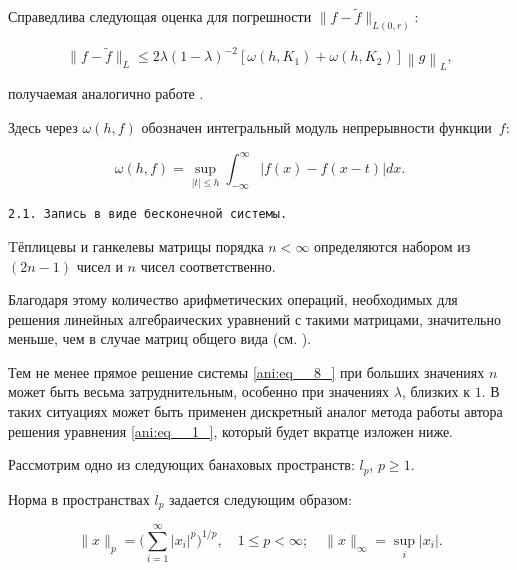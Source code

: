 Справедлива следующая оценка  для погрешности $ \| f-\tilde{f} \| _{L\left(0,r\right)} $:

\begin{equation}\label{ani:eq12}

\| f-\tilde{f} \| _{L} \le 2 \lambda \left(1 - {\lambda} \right)^{-2} \left[\omega \left(h,K_{1} \right)+\omega \left(h,K_{2} \right)\right]\left\| g\right\| _{L} ,\end{equation}

получаемая аналогично работе \cite{ani:EnB}.

Здесь через $\omega \left(h,f\right)$ обозначен интегральный модуль непрерывности функции~$f$:



\[\omega \left(h,f\right)=\mathop{\sup }\limits_{|t|\le h} \int _{-\infty }^{\infty } \left|f (x) -f (x-t) \right|dx.\]





\smallskip






\texttt{2.1. Запись в виде бесконечной системы.} 

Tёплицевы  и ганкелевы матрицы порядка $n<\infty$  определяются  набором из $\left(2n-1\right)$ чисел и $n$ чисел соответственно.  

Благодаря этому количество арифметических операций, необходимых для  решения линейных алгебраических уравнений с такими матрицами, значительно меньше, чем в случае матриц общего вида (см. \cite{ani:Pr}).  

Тем не менее прямое решение системы  \eqref{ani:eq__8_} при больших значениях $n$ может быть весьма затруднительным, особенно при значениях $\lambda $, близких к $1$. В таких ситуациях может быть применен дискретный аналог метода работы автора \cite{ani:Izv} решения уравнения \eqref{ani:eq__1_}, который будет вкратце изложен ниже.



Рассмотрим одно из следующих банаховых пространств: $l_{p} $, $p\ge 1$. %

  Норма в пространствах  $l_{p} $ задается следующим образом:

\[

\| x\|  _{p} =\biggl(\sum\limits _{i=1}^{\infty } |x_{i}  |^{p}  \biggr)^{{1}/{p} }, \quad  1\le p<\infty; \quad   \| x\|  _{\infty } =\mathop{\sup }\limits_{i} \left|x_{i} \right|.

\]




